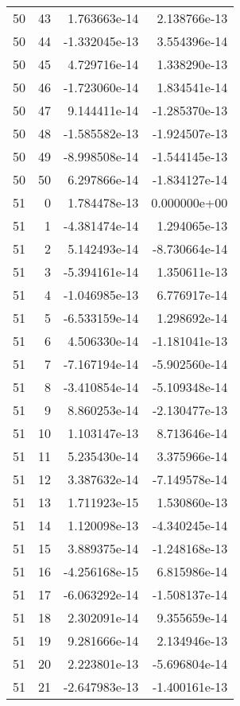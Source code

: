 \begin{tabular}{rrrr}
  50 &   43 &  1.763663e-14 &  2.138766e-13 \\
  50 &   44 & -1.332045e-13 &  3.554396e-14 \\
  50 &   45 &  4.729716e-14 &  1.338290e-13 \\
  50 &   46 & -1.723060e-14 &  1.834541e-14 \\
  50 &   47 &  9.144411e-14 & -1.285370e-13 \\
  50 &   48 & -1.585582e-13 & -1.924507e-13 \\
  50 &   49 & -8.998508e-14 & -1.544145e-13 \\
  50 &   50 &  6.297866e-14 & -1.834127e-14 \\
  51 &    0 &  1.784478e-13 &  0.000000e+00 \\
  51 &    1 & -4.381474e-14 &  1.294065e-13 \\
  51 &    2 &  5.142493e-14 & -8.730664e-14 \\
  51 &    3 & -5.394161e-14 &  1.350611e-13 \\
  51 &    4 & -1.046985e-13 &  6.776917e-14 \\
  51 &    5 & -6.533159e-14 &  1.298692e-14 \\
  51 &    6 &  4.506330e-14 & -1.181041e-13 \\
  51 &    7 & -7.167194e-14 & -5.902560e-14 \\
  51 &    8 & -3.410854e-14 & -5.109348e-14 \\
  51 &    9 &  8.860253e-14 & -2.130477e-13 \\
  51 &   10 &  1.103147e-13 &  8.713646e-14 \\
  51 &   11 &  5.235430e-14 &  3.375966e-14 \\
  51 &   12 &  3.387632e-14 & -7.149578e-14 \\
  51 &   13 &  1.711923e-15 &  1.530860e-13 \\
  51 &   14 &  1.120098e-13 & -4.340245e-14 \\
  51 &   15 &  3.889375e-14 & -1.248168e-13 \\
  51 &   16 & -4.256168e-15 &  6.815986e-14 \\
  51 &   17 & -6.063292e-14 & -1.508137e-14 \\
  51 &   18 &  2.302091e-14 &  9.355659e-14 \\
  51 &   19 &  9.281666e-14 &  2.134946e-13 \\
  51 &   20 &  2.223801e-13 & -5.696804e-14 \\
  51 &   21 & -2.647983e-13 & -1.400161e-13 \\

\end{tabular}
